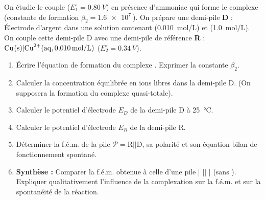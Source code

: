 \documentclass[11pt]{article}
\begin{document}
\begin{exercice}
On étudie le couple  ($E^\circ_1 = \SI{+0,80}{V}$) en présence d'ammoniac  qui forme le complexe \ce{[Ag(NH3)2]+} (constante de formation $\beta_2 = \SI{1,6e7}{}$).
On prépare une demi-pile \textbf{D} : Électrode d'argent dans une solution contenant  (\SI{0,010}{mol/L}) et  (\SI{1,0}{mol/L}). On couple cette demi-pile D avec une demi-pile de référence \textbf{R} : $\ce{Cu(s)} | \ce{Cu^{2+}(aq, 0,010 mol/L)}$ ($E^\circ_2 = \SI{+0,34}{V}$).
\begin{enumerate}
    \item Écrire l'équation de formation du complexe \ce{[Ag(NH3)2]+}. Exprimer la constante $\beta_2$.
    \item Calculer la concentration équilibrée en ions  libres dans la demi-pile D. (On supposera la formation du complexe quasi-totale).
    \item Calculer le potentiel d'électrode $E_D$ de la demi-pile D à \SI{25}{\celsius}.
    \item Calculer le potentiel d'électrode $E_R$ de la demi-pile R.
    \item Déterminer la f.é.m. de la pile $\mathcal{P} = \text{R} || \text{D}$, sa polarité et son équation-bilan de fonctionnement spontané.
    \item \textbf{Synthèse :} Comparer la f.é.m. obtenue à celle d'une pile  |  ||  |  (sans ). Expliquer qualitativement l'influence de la complexation sur la f.é.m. et sur la spontanéité de la réaction.
\end{enumerate}
\end{exercice}
\end{document}
